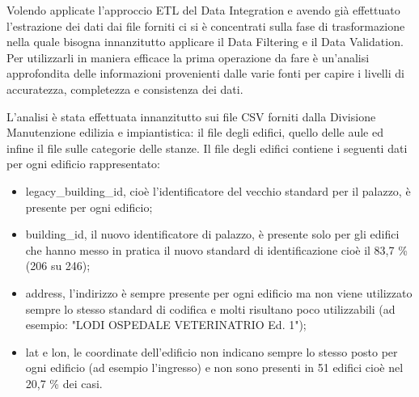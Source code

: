\documentclass[12pt]{report}
\begin{document}
Volendo applicate l'approccio ETL del Data Integration e avendo già effettuato l'estrazione dei dati dai file forniti ci si è concentrati sulla fase di trasformazione nella quale bisogna innanzitutto applicare il Data Filtering e il Data Validation.
Per utilizzarli in maniera efficace la prima operazione da fare è un'analisi approfondita delle informazioni provenienti dalle varie fonti per capire i livelli di accuratezza, completezza e consistenza dei dati.

L'analisi è stata effettuata innanzitutto sui file CSV forniti dalla Divisione Manutenzione edilizia e impiantistica: il file degli edifici, quello delle aule ed infine il file sulle categorie delle stanze.
Il file degli edifici contiene i seguenti dati per ogni edificio rappresentato:
\begin{itemize}
\item legacy\_building\_id, cioè l'identificatore del vecchio standard per il palazzo, è presente per ogni edificio;
\item building\_id, il nuovo identificatore di palazzo, è presente solo per gli edifici che hanno messo in pratica il nuovo standard di identificazione cioè il 83,7 \% (206 su 246);
\item address, l'indirizzo è sempre presente per ogni edificio ma non viene utilizzato sempre lo stesso standard di codifica e molti risultano poco utilizzabili (ad esempio: "LODI OSPEDALE VETERINATRIO Ed. 1");
\item lat e lon, le coordinate dell'edificio non indicano sempre lo stesso posto per ogni edificio (ad esempio l'ingresso) e non sono presenti in 51 edifici cioè nel 20,7 \% dei casi.
\end{itemize}
\end{document}
